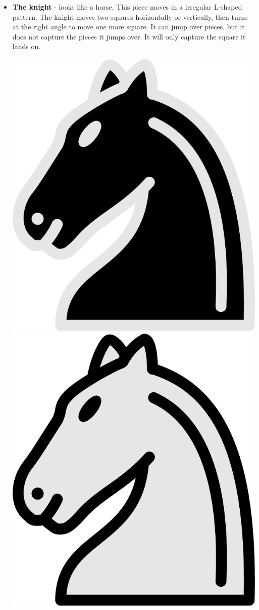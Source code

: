 \documentclass{article}
\begin{document}
\begin{itemize}
    \item \textbf{The knight} - looks like a horse. This piece moves in a irregular L-shaped pattern. The knight moves two squares horizontally or vertically, then turns at the right angle to move one more square. It can jump over pieces, but it does not capture the pieces it jumps over. It will only capture the square it lands on. \\
    \begin{center}
    	\includegraphics[scale=0.1]{image13.png}
    	\includegraphics[scale=0.1]{image10.png}

\end{center}
\end{itemize}
\end{document}
